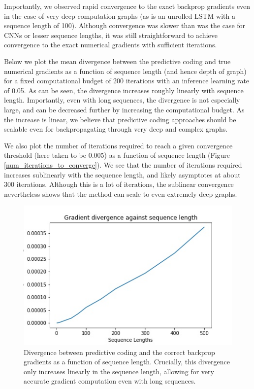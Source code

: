 Importantly, we observed rapid convergence to the exact backprop gradients even in the case of very deep computation graphs (as is an unrolled LSTM with a sequence length of 100). Although convergence was slower than was the case for CNNs or lesser sequence lengths, it was still straightforward to achieve convergence to the exact numerical gradients with sufficient iterations.

Below we plot the mean divergence between the predictive coding and true numerical gradients as a function of sequence length (and hence depth of graph) for a fixed computational budget of 200 iterations with an inference learning rate of 0.05. As can be seen, the divergence increases roughly linearly with sequence length. Importantly, even with long sequences, the divergence is not especially large, and can be decreased further by increasing the computational budget. As the increase is linear, we believe that predictive coding approaches should be scalable even for backpropagating through very deep and complex graphs.

We also plot the number of iterations required to reach a given convergence threshold (here taken to be 0.005) as a function of sequence length (Figure \ref{num_iterations_to_converge}). We see that the number of iterations required increases sublinearly with the sequence length, and likely asymptotes at about 300 iterations. Although this is a lot of iterations, the sublinear convergence nevertheless shows that the method can scale to even extremely deep graphs.

\begin{figure}[ht]
  \centering
  \includegraphics[width=.9\linewidth]{chapter_6_figures/lstm_seqlen_divergences.jpg}  
\caption{Divergence between predictive coding and the correct backprop gradients as a function of sequence length. Crucially, this divergence only increases linearly in the sequence length, allowing for very accurate gradient computation even with long sequences.}
\label{sequence_length_effect}

\end{figure}

